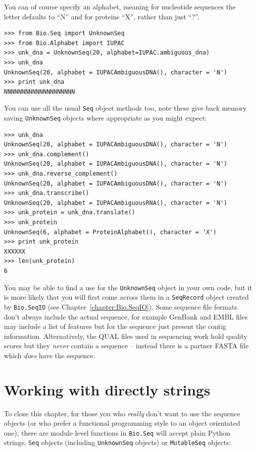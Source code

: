 \documentclass{report}
\begin{document}
You can of course specify an alphabet, meaning for nucleotide sequences
the letter defaults to ``N'' and for proteins ``X'', rather than just ``?''.

\begin{verbatim}
>>> from Bio.Seq import UnknownSeq
>>> from Bio.Alphabet import IUPAC
>>> unk_dna = UnknownSeq(20, alphabet=IUPAC.ambiguous_dna)
>>> unk_dna
UnknownSeq(20, alphabet = IUPACAmbiguousDNA(), character = 'N')
>>> print unk_dna
NNNNNNNNNNNNNNNNNNNN
\end{verbatim}

You can use all the usual \verb|Seq| object methods too, note these give back
memory saving \verb|UnknownSeq| objects where appropriate as you might expect:

\begin{verbatim}
>>> unk_dna
UnknownSeq(20, alphabet = IUPACAmbiguousDNA(), character = 'N')
>>> unk_dna.complement()
UnknownSeq(20, alphabet = IUPACAmbiguousDNA(), character = 'N')
>>> unk_dna.reverse_complement()
UnknownSeq(20, alphabet = IUPACAmbiguousDNA(), character = 'N')
>>> unk_dna.transcribe()
UnknownSeq(20, alphabet = IUPACAmbiguousRNA(), character = 'N')
>>> unk_protein = unk_dna.translate()
>>> unk_protein
UnknownSeq(6, alphabet = ProteinAlphabet(), character = 'X')
>>> print unk_protein
XXXXXX
>>> len(unk_protein)
6
\end{verbatim}

You may be able to find a use for the \verb|UnknownSeq| object in your own
code, but it is more likely that you will first come across them in a
\verb|SeqRecord| object created by \verb|Bio.SeqIO|
(see Chapter~\ref{chapter:Bio.SeqIO}).
Some sequence file formats don't always include the actual sequence, for
example GenBank and EMBL files may include a list of features but for the
sequence just present the contig information.  Alternatively, the QUAL files
used in sequencing work hold quality scores but they \emph{never} contain a
sequence -- instead there is a partner FASTA file which \emph{does} have the
sequence.

\section{Working with directly strings}
\label{sec:seq-module-functions}
To close this chapter, for those you who \emph{really} don't want to use the sequence
objects (or who prefer a functional programming style to an object orientated one),
there are module level functions in \verb|Bio.Seq| will accept plain Python strings,
\verb|Seq| objects (including \verb|UnknownSeq| objects) or \verb|MutableSeq| objects:
\end{document}
